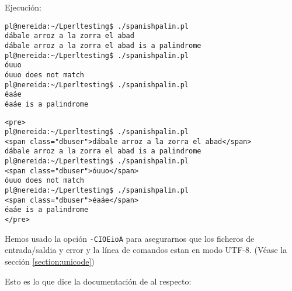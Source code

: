 Ejecución:

\begin{latexonly}
\begin{verbatim}
pl@nereida:~/Lperltesting$ ./spanishpalin.pl
dábale arroz a la zorra el abad
dábale arroz a la zorra el abad is a palindrome
pl@nereida:~/Lperltesting$ ./spanishpalin.pl
óuuo
óuuo does not match
pl@nereida:~/Lperltesting$ ./spanishpalin.pl
éaáe
éaáe is a palindrome
\end{verbatim}
\end{latexonly}
\begin{verbatim}
<pre>
pl@nereida:~/Lperltesting$ ./spanishpalin.pl
<span class="dbuser">dábale arroz a la zorra el abad</span>
dábale arroz a la zorra el abad is a palindrome
pl@nereida:~/Lperltesting$ ./spanishpalin.pl
<span class="dbuser">óuuo</span>
óuuo does not match
pl@nereida:~/Lperltesting$ ./spanishpalin.pl
<span class="dbuser">éaáe</span>
éaáe is a palindrome
</pre>
\end{verbatim}


Hemos usado la opción \verb|-CIOEioA| para asegurarnos
que los ficheros de entrada/saldia y error y la línea de
comandos estan en modo UTF-8.
(Véase la sección \ref{section:unicode})

Esto es lo que dice la documentación de 
al respecto:

